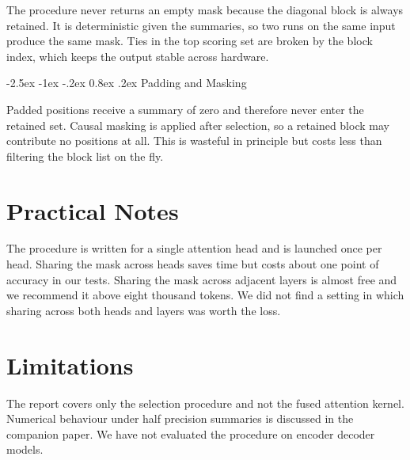 \documentclass[10pt,twocolumn,a4paper]{article}
\makeatletter
\newcommand{\s}[1]{#1}
\renewcommand\subsection{\@startsection{subsection}{2}{\z@}%
  {-2.5ex \@plus -1ex \@minus -.2ex}%
  {0.8ex \@plus .2ex}%
  {\normalfont\normalsize\bfseries}}
\makeatother
\begin{document}
\s{The procedure never returns an empty mask because the diagonal block is always retained.}
\s{It is deterministic given the summaries, so two runs on the same input produce the same mask.}
\s{Ties in the top scoring set are broken by the block index, which keeps the output stable across hardware.}

\subsection{Padding and Masking}

\s{Padded positions receive a summary of zero and therefore never enter the retained set.}
\s{Causal masking is applied after selection, so a retained block may contribute no positions at all.}
\s{This is wasteful in principle but costs less than filtering the block list on the fly.}

\section{Practical Notes}

\s{The procedure is written for a single attention head and is launched once per head.}
\s{Sharing the mask across heads saves time but costs about one point of accuracy in our tests.}
\s{Sharing the mask across adjacent layers is almost free and we recommend it above eight thousand tokens.}
\s{We did not find a setting in which sharing across both heads and layers was worth the loss.}

\section{Limitations}

\s{The report covers only the selection procedure and not the fused attention kernel.}
\s{Numerical behaviour under half precision summaries is discussed in the companion paper.}
\s{We have not evaluated the procedure on encoder decoder models.}
\end{document}
